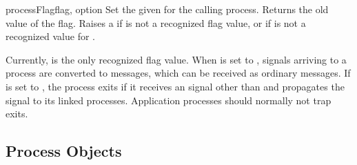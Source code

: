 \documentclass{howto}
\begin{document}
\begin{funcdesc}{processFlag}{flag, option}
Set the given  for the calling process. Returns the old value of the
flag. Raises a   if  is not a
recognized flag value, or if  is not a recognized value for
.

Currently,  is the only recognized flag value. When
 is set to ,  signals arriving to
a process are converted to  messages, which can be
received as ordinary messages. If  is set to ,
the process exits if it receives an  signal other than
 and propagates the  signal to its linked processes.
Application processes should normally not trap exits.
\end{funcdesc}



\subsection{Process Objects}
\end{document}
